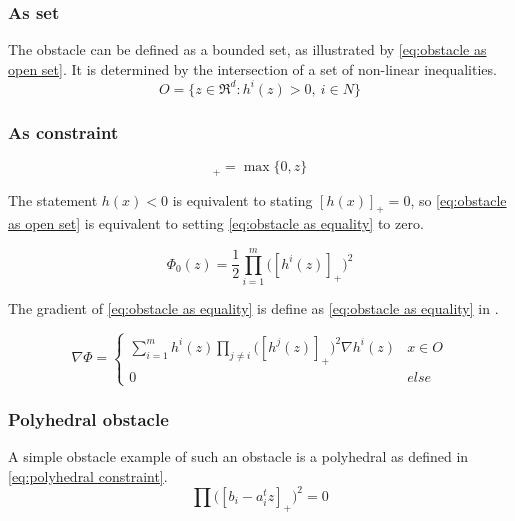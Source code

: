 			\subsubsection{As set}
				 The obstacle can be defined as a bounded set, as illustrated by \eqref{eq:obstacle as open set}. It is determined by the intersection of a set of non-linear inequalities.
				\begin{equation}
					O = \{ z \in \Re^d : h^i(z)>0,\ i \in N \}
					\label{eq:obstacle as open set}
				\end{equation}
				
			\subsubsection{As constraint}
				\begin{equation}
					[z]_+ =  \max\{0,z\}
				\end{equation}
				
				The statement $h(x)<0$ is equivalent to stating $[h(x)]_+=0$, so \eqref{eq:obstacle as open set} is equivalent to setting \eqref{eq:obstacle as equality} to zero.
				
				\begin{equation}
					\Phi_0(z) =  \frac{1}{2} \prod_{i=1}^m \Big( [h^i(z)]_+ \Big)^2
					\label{eq:obstacle as equality}
				\end{equation}
				
				The gradient of \eqref{eq:obstacle as equality} is define as \eqref{eq:obstacle as equality} in \cite{AjaySathya2017}.
				
				\begin{equation}
					\nabla \Phi =
					\begin{cases}
						\sum_{i=1}^{m} h^i(z)\prod_{j \ne i} \Big( [h^j(z)]_+ \Big)^2 \nabla h^i(z)
						& x \in O \\
						0 & else
					\end{cases}
					\label{eq:derivative obstacle as equality}
				\end{equation}
			
			\subsubsection{Polyhedral obstacle}
				A simple obstacle example of such an obstacle is a polyhedral as defined in \eqref{eq:polyhedral constraint}.
				\begin{equation}
					\prod \Big([b_i - a_i^t z]_+ \Big)^2 = 0
					\label{eq:polyhedral constraint}
				\end{equation}
			
